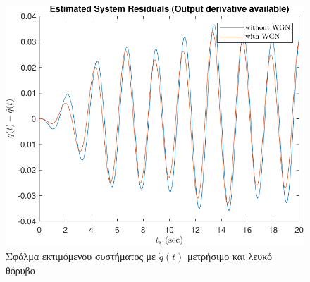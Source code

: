 \documentclass[a4paper,12pt]{article}
\begin{document}
\begin{figure}[!h]
\begin{minipage}{0.45\textwidth}
        \includegraphics[width=\linewidth]{plot/task3_residuals_with_derivative_WGN.pdf}
        \caption{Σφάλμα εκτιμόμενου συστήματος με $\dot{q}(t)$ μετρήσιμο και λευκό θόρυβο}
        \label{fig:task3_residuals_with_derivative_WGN}
    \end{minipage}
\end{figure}
\end{document}
